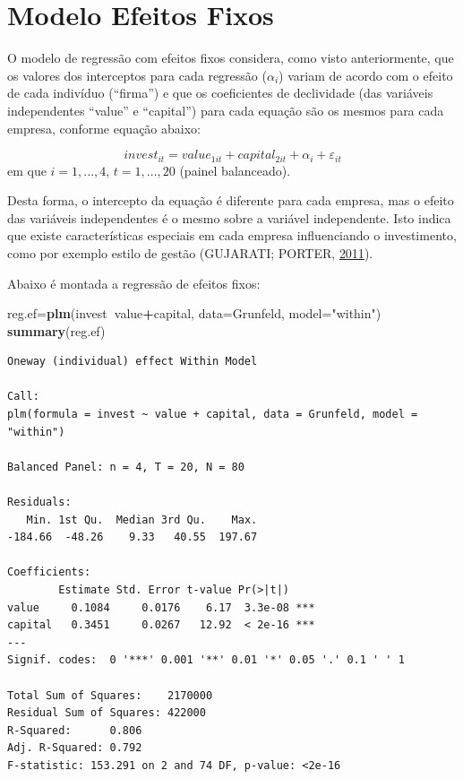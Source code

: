 \documentclass[12pt,brazil,oneside]{book}
\newenvironment{Shaded}{\begin{snugshade}}{\end{snugshade}}
\newcommand{\DataTypeTok}[1]{\textcolor[rgb]{0.13,0.29,0.53}{#1}}
\newcommand{\KeywordTok}[1]{\textcolor[rgb]{0.13,0.29,0.53}{\textbf{#1}}}
\newcommand{\NormalTok}[1]{#1}
\newcommand{\OperatorTok}[1]{\textcolor[rgb]{0.81,0.36,0.00}{\textbf{#1}}}
\newcommand{\StringTok}[1]{\textcolor[rgb]{0.31,0.60,0.02}{#1}}
\begin{document}
\hypertarget{modelo-efeitos-fixos}{%
\section{Modelo Efeitos Fixos}\label{modelo-efeitos-fixos}}

O modelo de regressão com efeitos fixos considera, como visto
anteriormente, que os valores dos interceptos para cada regressão
(\(\alpha_i\)) variam de acordo com o efeito de cada indivíduo
(``firma'') e que os coeficientes de declividade (das variáveis
independentes ``value'' e ``capital'') para cada equação são os mesmos
para cada empresa, conforme equação abaixo:

\[
invest_{it} = value_{1it} + capital_{2it} + \alpha_i + \varepsilon_{it}
\] em que \(i=1,...,4\), \(t=1,...,20\) (painel balanceado).

Desta forma, o intercepto da equação é diferente para cada empresa, mas
o efeito das variáveis independentes é o mesmo sobre a variável
independente. Isto indica que existe características especiais em cada
empresa influenciando o investimento, como por exemplo estilo de gestão
(GUJARATI; PORTER, \protect\hyperlink{ref-Gujarati2011}{2011}).

Abaixo é montada a regressão de efeitos fixos:

\begin{Shaded}
\begin{Highlighting}[]
\NormalTok{reg.ef=}\KeywordTok{plm}\NormalTok{(invest}\OperatorTok{~}\NormalTok{value}\OperatorTok{+}\NormalTok{capital, }
           \DataTypeTok{data=}\NormalTok{Grunfeld, }\DataTypeTok{model=}\StringTok{"within"}\NormalTok{)}
\KeywordTok{summary}\NormalTok{(reg.ef)}
\end{Highlighting}
\end{Shaded}

\begin{verbatim}
Oneway (individual) effect Within Model

Call:
plm(formula = invest ~ value + capital, data = Grunfeld, model = "within")

Balanced Panel: n = 4, T = 20, N = 80

Residuals:
   Min. 1st Qu.  Median 3rd Qu.    Max. 
-184.66  -48.26    9.33   40.55  197.67 

Coefficients:
        Estimate Std. Error t-value Pr(>|t|)    
value     0.1084     0.0176    6.17  3.3e-08 ***
capital   0.3451     0.0267   12.92  < 2e-16 ***
---
Signif. codes:  0 '***' 0.001 '**' 0.01 '*' 0.05 '.' 0.1 ' ' 1

Total Sum of Squares:    2170000
Residual Sum of Squares: 422000
R-Squared:      0.806
Adj. R-Squared: 0.792
F-statistic: 153.291 on 2 and 74 DF, p-value: <2e-16
\end{verbatim}
\end{document}
